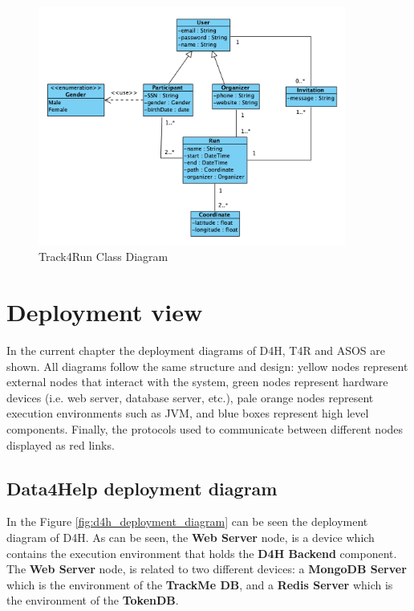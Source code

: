 \documentclass[a4paper, hidelinks, 12pt]{report}
\begin{document}
	\begin{figure}[H]
    		\centering
		\includegraphics[width=0.9\textwidth]{diagrams/t4r_class_diagram.png}
		\caption[Track4Run Class Diagram]{Track4Run Class Diagram}
		\label{fig:Track4Run Class Diagram}
	\end{figure}	
			
	\section{Deployment view}
	In the current chapter the deployment diagrams of D4H, T4R and ASOS are shown. All diagrams follow the same structure and design: yellow nodes represent external nodes that interact with the system, green nodes represent hardware devices (i.e. web server, database server, etc.), pale orange nodes represent execution environments such as JVM, and blue boxes represent high level components. Finally, the protocols used to communicate between different nodes displayed as red links.
	
	\subsection{Data4Help deployment diagram}
	In the Figure \ref{fig:d4h_deployment_diagram} can be seen the deployment diagram of D4H. As can be seen, the \textbf{Web Server} node, is a device which contains the execution environment that holds the \textbf{D4H Backend} component. The \textbf{Web Server} node, is related to two different devices: a \textbf{MongoDB Server} which is the environment of the \textbf{TrackMe DB}, and a \textbf{Redis Server} which is the environment of the \textbf{TokenDB}.\\
	
\end{document}
